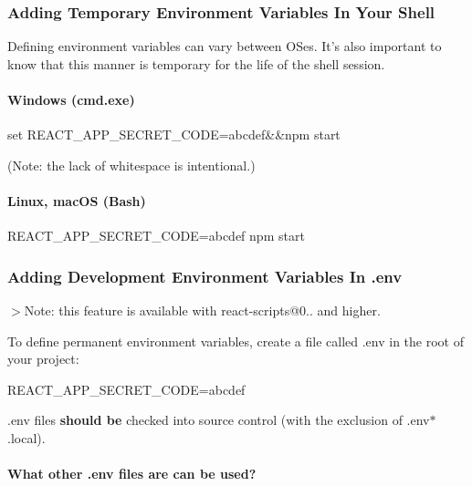 \subsubsection*{Adding Temporary Environment Variables In Your Shell}

Defining environment variables can vary between O\+Ses. It’s also important to know that this manner is temporary for the life of the shell session.

\paragraph*{Windows (cmd.\+exe)}


\begin{DoxyCode}
set REACT\_APP\_SECRET\_CODE=abcdef&&npm start
\end{DoxyCode}


(Note\+: the lack of whitespace is intentional.)

\paragraph*{Linux, mac\+OS (Bash)}


\begin{DoxyCode}
REACT\_APP\_SECRET\_CODE=abcdef npm start
\end{DoxyCode}


\subsubsection*{Adding Development Environment Variables In {\ttfamily .env}}

$>$Note\+: this feature is available with {\ttfamily react-\/scripts@0..} and higher.

To define permanent environment variables, create a file called {\ttfamily .env} in the root of your project\+:


\begin{DoxyCode}
REACT\_APP\_SECRET\_CODE=abcdef
\end{DoxyCode}


{\ttfamily .env} files {\bfseries should be} checked into source control (with the exclusion of {\ttfamily .env$\ast$.local}).

\paragraph*{What other {\ttfamily .env} files are can be used?}

